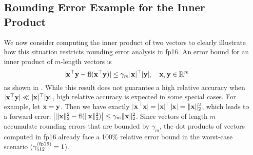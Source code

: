 \subsection{Rounding Error Example for the Inner Product}\label{sec:backgroundIP}
We now consider computing the inner product of two vectors to clearly illustrate how this situation restricts rounding error analysis in fp16. 
An error bound for an inner product of $m$-length vectors is
\begin{equation}
|\bb{x}^{\top}\bb{y} - \fl(\bb{x}^{\top}\bb{y})| \leq \gamma_{m} |\bb{x}|^{\top}|\bb{y}|, \quad \bb{x},\bb{y}\in\R^{m} \label{eqn:DDerr}
\end{equation}
as shown in \cite{Higham2002}.
While this result does not guarantee a high relative accuracy when $|\mathbf{x}^{\top}\mathbf{y}| \ll |\mathbf{x}|^{\top}|\mathbf{y}|$, high relative accuracy is expected in some special cases.
For example, let $\mathbf{x}=\mathbf{y}$.
Then we have exactly $|\mathbf{x}^{\top}\mathbf{x}| = |\mathbf{x}|^{\top}|\mathbf{x}|=\|\mathbf{x}\|_2^2$, which leads to a forward error: $\left|\|\mathbf{x}\|_2^2 - \mathrm{fl}(\|\mathbf{x}\|_2^2)\right| \leq \gamma_m \|\mathbf{x}\|_2^2$.
Since vectors of length $m$ accumulate rounding errors that are bounded by $\gamma_{m}$, the dot products of vectors computed in fp16 already face a 100\% relative error bound in the worst-case scenario ($\gamma_{512}^\text{(\text{fp16})}=1$). \par

